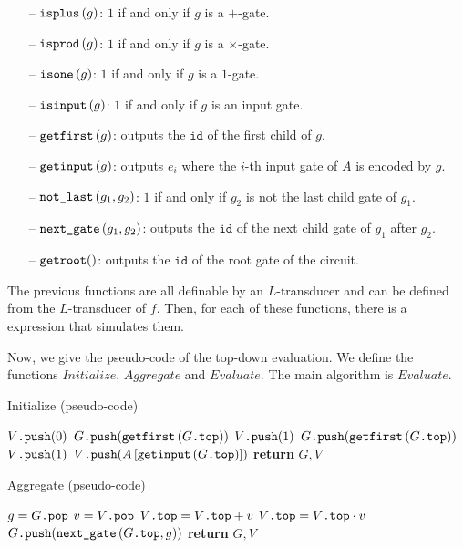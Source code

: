 \begin{itemize}
	\item[--] $\texttt{isplus}\left( g \right)$: $1$ if and only if $g$ is a $+$-gate.
	\item[--] $\texttt{isprod}\left(g \right)$: $1$ if and only if $g$ is a $\times$-gate.
	\item[--] $\texttt{isone}\left(g \right)$: $1$ if and only if $g$ is a $1$-gate.
	\item[--] $\texttt{isinput}\left(g \right)$: $1$ if and only if $g$ is an input gate.
	\item[--] $\texttt{getfirst}\left(g \right)$: outputs the $\texttt{id}$ of the first child of $g$.
	\item[--] $\texttt{getinput}\left(g \right)$: outputs $e_i$ where the $i$-th input gate of $A$ is encoded by $g$.
	\item[--] $\texttt{not{\_}last}\left(g_1,g_2 \right)$: $1$ if and only if $g_2$ is not the last child gate of $g_1$.
	\item[--] $\texttt{next{\_}gate}\left(g_1, g_2 \right)$: outputs the $\texttt{id}$ of the next child gate of $g_1$ after $g_2$.
	\item[--] $\texttt{getroot}()$: outputs the $\texttt{id}$ of the root gate of the circuit.
\end{itemize}

The previous functions are all definable by an $L$-transducer and can be defined from the $L$-transducer of $f$. Then, for each of these functions, there is a \langfor expression that simulates them.

Now, we give the pseudo-code of the top-down evaluation. We define the functions $Initialize$, $Aggregate$ and $Evaluate$. The main algorithm is $Evaluate$.

\begin{algorithm}
\caption{Initialize (pseudo-code)}\label{alg:init_code}
\begin{algorithmic}[1]
		\State $V\texttt{.push}(0)$
		\State $G\texttt{.push}(\texttt{getfirst}\left(G\texttt{.top} \right))$
		\State $V\texttt{.push}(1)$
		\State $G\texttt{.push}(\texttt{getfirst}\left(G\texttt{.top} \right))$
		\State $V\texttt{.push}(1)$
		\State $V\texttt{.push}(A\left[ \texttt{getinput}\left(G\texttt{.top} \right) \right])$
	\EndIf
	\State \textbf{return} $G, V$
\EndFunction
\end{algorithmic}
\end{algorithm}

\begin{algorithm}
\caption{Aggregate (pseudo-code)}\label{alg:agg_code}
\begin{algorithmic}[1]
	\State $g = G\texttt{.pop}$
	\State $v = V\texttt{.pop}$
		\State $V\texttt{.top} = V\texttt{.top} + v$
		\State $V\texttt{.top} = V\texttt{.top} \cdot v$
	\EndIf
		\State $G\texttt{.push}(\texttt{next{\_}gate}\left(G\texttt{.top}, g \right))$
	\EndIf
	\State \textbf{return} $G, V$
\EndFunction
\end{algorithmic}
\end{algorithm}

